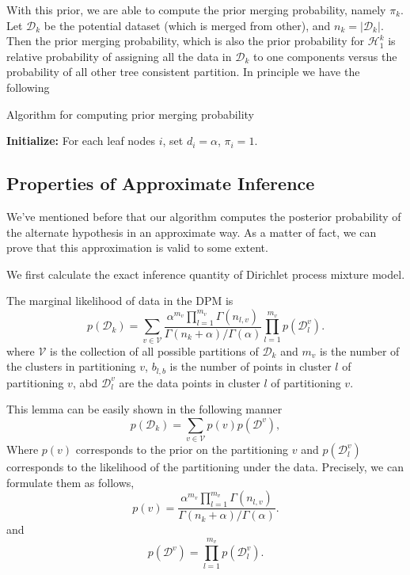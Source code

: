 With this prior, we are able to compute the prior merging probability, namely $\pi_k$. Let $\mathcal{D}_k$ be the potential dataset (which is merged from other), and $n_k=|\mathcal{D}_k|$. Then the prior merging probability, which is also the prior probability for $\mathcal{H}_1^k$ is relative probability of assigning all the data in $\mathcal{D}_k$ to one components versus the probability of all other tree consistent partition. In principle we have the following
\begin{algorithm}
\caption{Algorithm for computing prior merging probability}
\textbf{Initialize:} For each leaf nodes $i$, set $d_i=\alpha$, $\pi_i=1$.\;
\end{algorithm}

\subsection{Properties of Approximate Inference}

We've mentioned before that our algorithm computes the posterior probability of the alternate hypothesis in an approximate way. As a matter of fact, we can prove that this approximation is valid to some extent.

We first calculate the exact inference quantity of Dirichlet process mixture model.

\begin{lemma}
    The marginal likelihood of data in the DPM is  
\begin{equation*}
    p(\mathcal{D}_k)=\sum_{v\in \mathcal{V}} \frac{\alpha^{m_v}\prod_{l=1}^{m_v} \Gamma(n_{l,v})}{\Gamma(n_k+\alpha)/\Gamma(\alpha)}\prod_{l=1}^{m_v} p(\mathcal{D}_l^v).
\end{equation*}
where $\mathcal{V}$ is the collection of all possible partitions of $\mathcal{D}_k$ and $m_v$ is the number of the clusters in partitioning $v$, $b_{l,b}$ is the number of points in cluster $l$ of partitioning $v$, abd $\mathcal{D}_l^v $ are the data points in cluster $l$ of partitioning $v$.
\end{lemma}

This lemma can be easily shown in the following manner
\begin{equation*}
    p(\mathcal{D}_k)=\sum_{v\in \mathcal{V}} p(v)p(\mathcal{D}^v),
\end{equation*}
Where $p(v)$ corresponds to the prior on the partitioning $v$ and $p(\mathcal{D}_l^v)$ corresponds to the likelihood of the partitioning under the data. Precisely, we can formulate them as follows, 
\begin{equation*}
    p(v)=\frac{\alpha^{m_v} \prod_{l=1}^{m_v} \Gamma(n_{l,v})}{\Gamma(n_k+\alpha)/\Gamma(\alpha)}.
\end{equation*}
and
\begin{equation*}
    p(\mathcal{D}^v)=\prod_{l=1}^{m_v} p(\mathcal{D}_l^v ).
\end{equation*}

